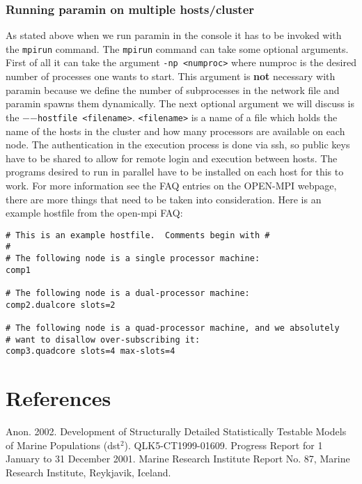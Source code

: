 \documentclass[10pt,twoside]{book}
\begin{document}
\subsection{Running paramin on multiple hosts/cluster}
As stated above when we run paramin in the console it has to be invoked with the \texttt{mpirun} command. The \texttt{mpirun} command can take
some optional arguments. First of all it can take the argument \texttt{-np <numproc>} where numproc is the desired number of processes one wants to
start. This argument is \textbf{not} necessary with paramin because we define the number of subprocesses in the network file and paramin spawns them
dynamically. The next optional argument we will discuss is the $-$$-$\texttt{hostfile <filename>}. \texttt{<filename>} is a name of a file which holds
the name of the hosts in the cluster and how many processors are available on each node. The authentication in the execution process is done via
ssh, so public keys have to be shared to allow for remote login and execution between hosts. The programs desired to run in parallel have to be 
installed on each host for this to work. For more information see the FAQ entries on the OPEN-MPI webpage, there are more things that need to be taken 
into consideration. Here is an example hostfile from the open-mpi FAQ:

{\small\begin{verbatim}
# This is an example hostfile.  Comments begin with #
#
# The following node is a single processor machine:
comp1

# The following node is a dual-processor machine:
comp2.dualcore slots=2

# The following node is a quad-processor machine, and we absolutely
# want to disallow over-subscribing it:
comp3.quadcore slots=4 max-slots=4
\end{verbatim}}


\chapter{References}\label{chap:reference}
Anon. 2002. Development of Structurally Detailed Statistically Testable Models of Marine Populations (dst$^{2}$). QLK5-CT1999-01609. Progress Report for 1 January to 31 December 2001. Marine Research Institute Report No. 87, Marine Research Institute, Reykjavik, Iceland.\newline
\end{document}
